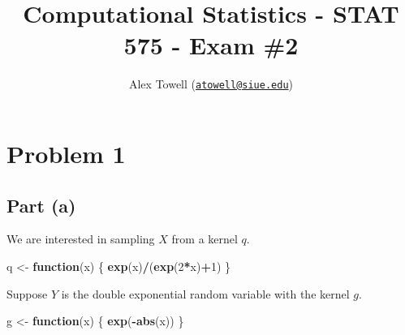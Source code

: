 \documentclass[
  11pt,
]{article}
\title{Computational Statistics - STAT 575 - Exam \#2}
\author{Alex Towell
(\href{mailto:atowell@siue.edu}{\nolinkurl{atowell@siue.edu}})}
\date{}
\newenvironment{Shaded}{\begin{snugshade}}{\end{snugshade}}
\newcommand{\ControlFlowTok}[1]{\textcolor[rgb]{0.13,0.29,0.53}{\textbf{#1}}}
\newcommand{\DecValTok}[1]{\textcolor[rgb]{0.00,0.00,0.81}{#1}}
\newcommand{\FunctionTok}[1]{\textcolor[rgb]{0.13,0.29,0.53}{\textbf{#1}}}
\newcommand{\NormalTok}[1]{#1}
\newcommand{\OtherTok}[1]{\textcolor[rgb]{0.56,0.35,0.01}{#1}}
\newcommand{\SpecialCharTok}[1]{\textcolor[rgb]{0.81,0.36,0.00}{\textbf{#1}}}
\begin{document}
\maketitle

\hypertarget{problem-1}{%
\section{Problem 1}\label{problem-1}}


\hypertarget{part-a}{%
\subsection{Part (a)}\label{part-a}}


We are interested in sampling \(X\) from a kernel \(q\).

\begin{Shaded}
\begin{Highlighting}[]
\NormalTok{q }\OtherTok{\textless{}{-}} \ControlFlowTok{function}\NormalTok{(x) \{ }\FunctionTok{exp}\NormalTok{(x)}\SpecialCharTok{/}\NormalTok{(}\FunctionTok{exp}\NormalTok{(}\DecValTok{2}\SpecialCharTok{*}\NormalTok{x)}\SpecialCharTok{+}\DecValTok{1}\NormalTok{) \}}
\end{Highlighting}
\end{Shaded}

Suppose \(Y\) is the double exponential random variable with the kernel
\(g\).

\begin{Shaded}
\begin{Highlighting}[]
\NormalTok{g }\OtherTok{\textless{}{-}} \ControlFlowTok{function}\NormalTok{(x) \{ }\FunctionTok{exp}\NormalTok{(}\SpecialCharTok{{-}}\FunctionTok{abs}\NormalTok{(x)) \}}
\end{Highlighting}
\end{Shaded}
\end{document}
